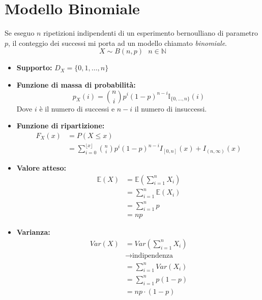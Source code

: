 \documentclass[11pt]{report}
\begin{document}
\begin{center}
    
\end{center}
\begin{center}
    
\end{center}
\begin{center}
    
\end{center}

\section{Modello Binomiale}
Se eseguo $n$ ripetizioni indipendenti di un esperimento bernoulliano di parametro $p$, il conteggio dei successi mi porta ad un modello chiamato \textit{binomiale}.
\begin{equation}
    X\sim B(n,p)\ \ \ n \in \mathbb{N}
\end{equation}
\begin{itemize}
    \item \textbf{Supporto:} $D_X=\{0,1,\dots,n\}$
    \item \textbf{Funzione di massa di probabilità:}
    \begin{equation}
        p_X(i) = \binom{n}{i}p^i(1-p)^{n-i} \mathbb{I}_{\{0,\dots,n\}}(i)
    \end{equation}
    Dove $i$ è il numero di successi e $n-i$ il numero di insuccessi.
    \item \textbf{Funzione di ripartizione:}
    \begin{equation}
        \begin{split}
            F_X(x) & = P(X \leq x)\\
            & = \sum_{i=0}^{\lfloor x\rfloor}\binom{n}{i}p^i(1-p)^{n-i} I_{[0,n]}(x) + I_{(n,\infty)}(x)
        \end{split}
    \end{equation}
    \item \textbf{Valore atteso:}
    \begin{equation}
    	\begin{split}
   			\mathbb{E}(X) & = \mathbb{E}\left(\sum_{i=1}^n X_i \right)\\
   			& = \sum_{i=1}^n \mathbb{E}(X_i)\\
   			& = \sum_{i=1}^n p\\
   			& = np
		\end{split}
    \end{equation}
    \item \textbf{Varianza:}
    \begin{equation}
    	\begin{split}
   			Var(X) & = Var\left(\sum_{i=1}^n X_i \right)\\
            & \rightarrow \text{indipendenza}\\
   			& = \sum_{i=1}^n Var(X_i)\\
   			& = \sum_{i=1}^n p(1-p)\\
   			& = np \cdot (1-p)
		\end{split}
    \end{equation}
\end{itemize}
\end{document}
